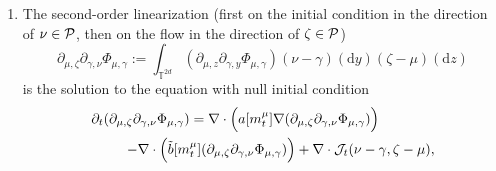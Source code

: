 \begin{enumerate}
\begin{align*}
 - m^{\mu}_t   \Big(\int_{\mathbb{T}^d}\frac{\delta \tilde{b}(\mu, \cdot)}{\delta\mu}[m_t^{\mu}](y)\mathrm{d}P^{\mu}_{0,t} (\nu - \mu)(y)\Big).
\end{align*}
(\ref{eq:first-order-deriv-KOL_re}) then establishes (\ref{eq:J1}), after we identify
\[
J^{\mu,1}(\nu - \mu) = \big(\partial_{\mu,\nu} \Phi_{\mu,\gamma}\big)\Big|_{\gamma = \mu}.
\]
We have derived therefore $\partial_{\mu,\nu}m^{\mu}$ combining the consideration above. Plugging the solution to (\ref{eq:first-order-deriv-KOL_re}) back into (\ref{eq:first_lin_m^mu}), we derive the first-order linearization $\partial_{\mu,\nu} \Phi_{\mu,\gamma}$ of the flow as the solution to the equation
\begin{equation}\label{eq:first-order-deriv-KOL}
\begin{split}
\partial_t \partial_{\mu,\nu} \Phi_{\mu,\gamma} - \nabla \cdot \Big( a[m_t^{\mu}] \nabla \partial_{\mu,\nu} \Phi_{\mu,\gamma} + \tilde{b}[m_t^{\mu}] \partial_{\mu,\nu} \Phi_{\mu,\gamma}\Big) = \mcl{H}_t(\nu - \mu),
\end{split}
\end{equation}
with null initial condition, and the forcing term defined by 
\begin{align*}
 \mcl{H}(\nu - \mu) = \nabla \cdot \Big( \big[ \int_{\mathbb{T}^d} \frac{\delta a(\mu, \cdot)}{\delta\mu}\big[m^{\mu}\big](y) \partial_{\mu,\nu} m^{\mu}(\mathrm{d}y)\big]  \nabla \Phi_{\mu,\gamma}\Big)\\
 -  \nabla \cdot \Big(\big[ \int_{\mathbb{T}^d} \frac{\delta \tilde{b}(\mu, \cdot)}{\delta\mu}\big[m^{\mu}\big](y)\partial_{\mu,\nu} m^{\mu}(\mathrm{d}y)\big]  \Phi_{\mu,\gamma}\Big), 
\end{align*}
which is well-defined, since now $\partial_{\mu,\nu}m^{\mu}$ is known. 
\item The second-order linearization (first on the initial condition in the direction of $\nu \in \mathcal{P}$, then on the flow in the direction of $\zeta \in \mathcal{P}$) 
\[
\partial_{\mu, \zeta} \partial_{\gamma,\nu} \Phi_{\mu,\gamma} := \int_{\mathbb{T}^{2d}}(\partial_{\mu,z}\partial_{\gamma,y} \Phi_{\mu,\gamma}) (\nu - \gamma)(\mathrm{d}y)(\zeta - \mu)(\mathrm{d}z)
\]
is the solution to the equation with null initial condition
\begin{equation}\label{eq:I_mu_nu_epsilon_lin}
\begin{split}
\partial_t (\partial_{\mu, \zeta} \partial_{\gamma,\nu} \Phi_{\mu,\gamma}) =  \nabla \cdot \Big( a[m_t^{\mu}] \nabla (\partial_{\mu, \zeta} \partial_{\gamma,\nu} \Phi_{\mu,\gamma})\Big)\qquad\qquad \\ - \nabla \cdot \Big( \tilde{b}[m_t^{\mu}] (\partial_{\mu, \zeta} \partial_{\gamma,\nu} \Phi_{\mu,\gamma})\Big) + \nabla \cdot \mcl{J}_t(\nu - \gamma, \zeta - \mu),

\end{split}
\end{equation}
\end{enumerate}

